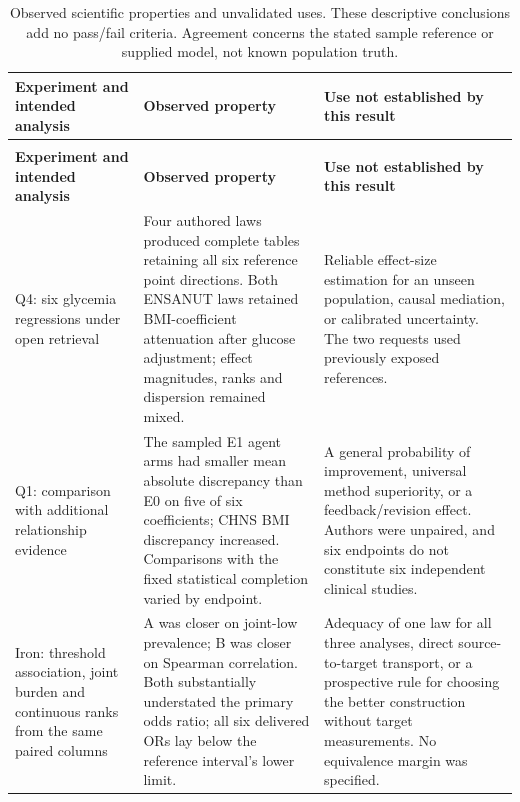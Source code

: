 \documentclass[11pt,letterpaper]{article}
\begin{document}
\begin{xltabular}{\linewidth}{@{}>{\raggedright\arraybackslash}X>{\raggedright\arraybackslash}X>{\raggedright\arraybackslash}X@{}}

\caption{Observed scientific properties and unvalidated uses. These descriptive conclusions add no pass/\allowbreak{}fail criteria. Agreement concerns the stated sample reference or supplied model, not known population truth.}\label{tab:7} \\

\toprule

\textbf{Experiment and intended analysis} & \textbf{Observed property} & \textbf{Use not established by this result} \\

\midrule

\endfirsthead

\\

\toprule

\textbf{Experiment and intended analysis} & \textbf{Observed property} & \textbf{Use not established by this result} \\

\midrule

\endhead

\bottomrule

\endfoot

Q4: six glycemia regressions under open retrieval & Four authored laws produced complete tables retaining all six reference point directions. Both ENSANUT laws retained BMI-coefficient attenuation after glucose adjustment; effect magnitudes, ranks and dispersion remained mixed. & Reliable effect-size estimation for an unseen population, causal mediation, or calibrated uncertainty. The two requests used previously exposed references. \\

Q1: comparison with additional relationship evidence & The sampled E1 agent arms had smaller mean absolute discrepancy than E0 on five of six coefficients; CHNS BMI discrepancy increased. Comparisons with the fixed statistical completion varied by endpoint. & A general probability of improvement, universal method superiority, or a feedback/\allowbreak{}revision effect. Authors were unpaired, and six endpoints do not constitute six independent clinical studies. \\

Iron: threshold association, joint burden and continuous ranks from the same paired columns & A was closer on joint-low prevalence; B was closer on Spearman correlation. Both substantially understated the primary odds ratio; all six delivered ORs lay below the reference interval's lower limit. & Adequacy of one law for all three analyses, direct source-to-target transport, or a prospective rule for choosing the better construction without target measurements. No equivalence margin was specified. \\


\end{xltabular}
\end{document}
